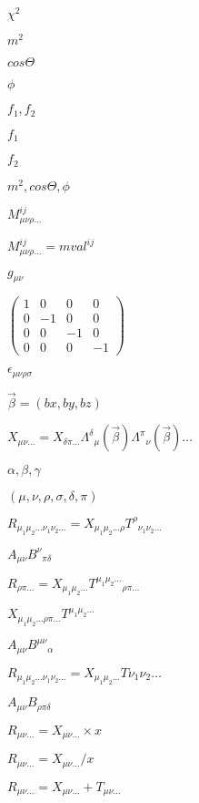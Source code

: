 \documentclass{article}
\begin{document}
$\chi^{2}$
\pagebreak

$m^2$
\pagebreak

$cos\Theta$
\pagebreak

$\phi$
\pagebreak

$f_1,f_2$
\pagebreak

$f_1$
\pagebreak

$f_2$
\pagebreak

$m^2, cos\Theta, \phi$
\pagebreak

$ M^{ij}_{\mu\nu\rho\ldots} $
\pagebreak

$ M^{ij}_{\mu\nu\rho\ldots} = mval^{ij} $
\pagebreak

$ g_{\mu\nu} $
\pagebreak

$ \left(\begin{array}{cccc} 1&0&0&0\\0&-1&0&0\\0&0&-1&0\\0&0&0&-1 \end{array}\right) $
\pagebreak

$\epsilon_{\mu\nu\rho\sigma}$
\pagebreak

$\vec{\beta}=(bx,by,bz)$
\pagebreak

$ X_{\mu\nu\ldots} = X_{\delta\pi\ldots} \Lambda^{\delta}{}_{\mu}(\vec{\beta})\Lambda^{\pi}{}_{\nu}(\vec{\beta}) \ldots $
\pagebreak

$ \alpha,\beta,\gamma $
\pagebreak

$ (\mu,\nu,\rho,\sigma,\delta,\pi) $
\pagebreak

$ R_{\mu_1\mu_2\ldots\nu_1\nu_2\ldots} = X_{\mu_1\mu_2\ldots\rho} T^{\rho}{}_{\nu_1\nu_2\ldots} $
\pagebreak

$ A_{\mu\nu} B^{\nu}{}_{\pi\delta} $
\pagebreak

$ R_{\rho\pi\ldots} = X_{\mu_1\mu_2\ldots} T^{\mu_1\mu_2\ldots}{}_{\rho\pi\ldots} $
\pagebreak

$ X_{\mu_1\mu_2\ldots\rho\pi\ldots} T^{\mu_1\mu_2\ldots} $
\pagebreak

$ A_{\mu\nu} B^{\mu\nu}{}_{\alpha} $
\pagebreak

$ R_{\mu_1\mu_2\ldots\nu_1\nu_2\ldots} = X_{\mu_1\mu_2\ldots} T{\nu_1\nu_2\ldots} $
\pagebreak

$ A_{\mu\nu} B_{\rho\pi\delta} $
\pagebreak

$ R_{\mu\nu\ldots} = X_{\mu\nu\ldots} \times x $
\pagebreak

$ R_{\mu\nu\ldots} = X_{\mu\nu\ldots} / x $
\pagebreak

$ R_{\mu\nu\ldots} = X_{\mu\nu\ldots} + T_{\mu\nu\ldots} $
\pagebreak
\end{document}
